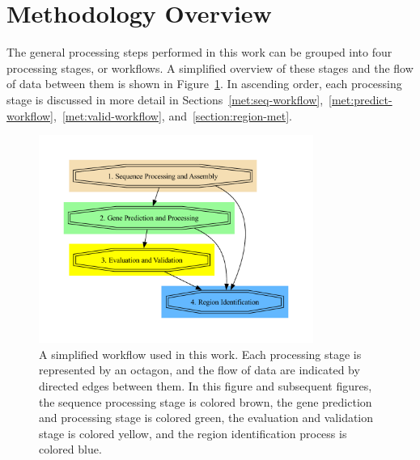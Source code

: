 \section{Methodology Overview}

The general processing steps performed in this work can be grouped
into four processing stages, or workflows. A simplified overview of
these stages and the flow of data between them is shown in Figure~\ref{fig:simple-work}. In ascending order, each processing stage is
discussed in more detail in Sections~\ref{met:seq-workflow},~\ref{met:predict-workflow},~\ref{met:valid-workflow}, and~\ref{section:region-met}.

\begin{figure}
  \centering
  \includegraphics[width=0.8\textwidth]{figures/workflow-simple.pdf}
  \caption[Workflow overview]{A simplified workflow used in this work. Each processing
    stage is represented by an octagon, and the flow of data are
    indicated by directed edges between them. In this figure and
    subsequent figures, the sequence processing stage is colored
    brown, the gene prediction and processing stage is colored green,
    the evaluation and validation stage is colored yellow, and the
    region identification process is colored blue.}\label{fig:simple-work}
\end{figure}


